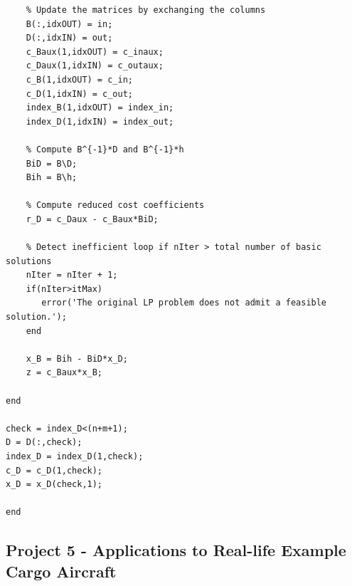 \documentclass[unicode,11pt,a4paper,oneside,numbers=endperiod,openany]{scrartcl}
\begin{document}
\begin{lstlisting}
    % Update the matrices by exchanging the columns
    B(:,idxOUT) = in;
    D(:,idxIN) = out;
    c_Baux(1,idxOUT) = c_inaux;
    c_Daux(1,idxIN) = c_outaux;
    c_B(1,idxOUT) = c_in;
    c_D(1,idxIN) = c_out;
    index_B(1,idxOUT) = index_in;
    index_D(1,idxIN) = index_out;

    % Compute B^{-1}*D and B^{-1}*h
    BiD = B\D;
    Bih = B\h;

    % Compute reduced cost coefficients
    r_D = c_Daux - c_Baux*BiD;

    % Detect inefficient loop if nIter > total number of basic solutions
    nIter = nIter + 1;
    if(nIter>itMax)
       error('The original LP problem does not admit a feasible solution.');
    end

    x_B = Bih - BiD*x_D;
    z = c_Baux*x_B;

end

check = index_D<(n+m+1);
D = D(:,check);
index_D = index_D(1,check);
c_D = c_D(1,check);
x_D = x_D(check,1);

end
\end{lstlisting}

\subsection{Project 5 - Applications to Real-life Example Cargo Aircraft}
\end{document}
